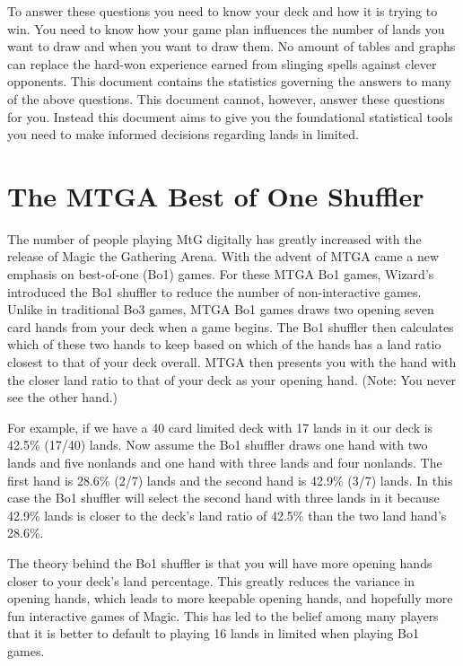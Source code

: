 \documentclass[oneside]{book}   %
\begin{document}
To answer these questions you need to know your deck and how it is trying to win. You need to know how your game plan influences the number of lands you want to draw and when you want to draw them. No amount of tables and graphs can replace the hard-won experience earned from slinging spells against clever opponents. This document contains the statistics governing the answers to many of the above questions. This document cannot, however, answer these questions for you. Instead this document aims to give you the foundational statistical tools you need to make informed decisions regarding lands in limited.

\section{The MTGA Best of One Shuffler}
\label{sec:computers_overview}

The number of people playing MtG digitally has greatly increased with the release of Magic the Gathering Arena. With the advent of MTGA came a new emphasis on best-of-one (Bo1) games. For these MTGA Bo1 games, Wizard's introduced the Bo1 shuffler to reduce the number of non-interactive games. Unlike in traditional Bo3 games, MTGA Bo1 games draws two opening seven card hands from your deck when a game begins. The Bo1 shuffler then calculates which of these two hands to keep based on which of the hands has a land ratio closest to that of your deck overall. MTGA then presents you with the hand with the closer land ratio to that of your deck as your opening hand. (Note: You never see the other hand.)

For example, if we have a 40 card limited deck with 17 lands in it our deck is 42.5\% (17/40) lands. Now assume the Bo1 shuffler draws one hand with two lands and five nonlands and one hand with three lands and four nonlands. The first hand is 28.6\% (2/7) lands and the second hand is 42.9\% (3/7) lands. In this case the Bo1 shuffler will select the second hand with three lands in it because 42.9\% lands is closer to the deck's land ratio of 42.5\% than the two land hand's 28.6\%. 

The theory behind the Bo1 shuffler is that you will have more opening hands closer to your deck's land percentage. This greatly reduces the variance in opening hands, which leads to more keepable opening hands, and hopefully more fun interactive games of Magic. This has led to the belief among many players that it is better to default to playing 16 lands in limited when playing Bo1 games. 
\end{document}
